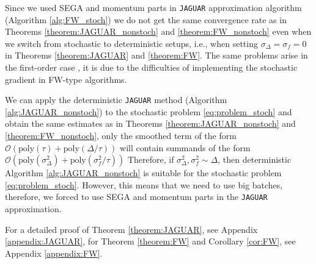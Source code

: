         Since we used SEGA and momentum parts in \texttt{JAGUAR} approximation algorithm (Algorithm \ref{alg:FW_stoch}) we do not get the same convergence rate as in Theorems \ref{theorem:JAGUAR_nonstoch} and \ref{theorem:FW_nonstoch} even when we switch from stochastic to deterministic setups, i.e., when setting $\sigma_\Delta = \sigma_f = 0$ in Theorems \ref{theorem:JAGUAR} and \ref{theorem:FW}. The same problems arise in the first-order case \cite{mokhtari2020stochastic, zhang2020one}, it is due to the difficulties of implementing the stochastic gradient in FW-type algorithms. 

        We can apply the deterministic \texttt{JAGUAR} method (Algorithm \ref{alg:JAGUAR_nonstoch}) to the stochastic problem \eqref{eq:problem_stoch} and obtain the same estimates as in Theorems \ref{theorem:JAGUAR_nonstoch} and \ref{theorem:FW_nonstoch}, only the smoothed term of the form $\mathcal{O}\left(\text{poly}(\tau) + \text{poly}(\Delta / \tau) \right)$ will contain summands of the form $\mathcal{O}\left(\text{poly}(\sigma_\Delta^2) + \text{poly}(\sigma_f^2 / \tau) \right)$ Therefore, if $\sigma_\Delta^2, \sigma_f^2 \sim \Delta$, then deterministic Algorithm \ref{alg:JAGUAR_nonstoch} is suitable for the stochastic problem \eqref{eq:problem_stoch}. However, this means that we need to use big batches, therefore, we forced to use SEGA and momentum parts in the \texttt{JAGUAR} approximation. 

        For a detailed proof of Theorem \ref{theorem:JAGUAR}, see Appendix \ref{appendix:JAGUAR}, for Theorem \ref{theorem:FW} and Corollary \ref{cor:FW}, see Appendix \ref{appendix:FW}. 